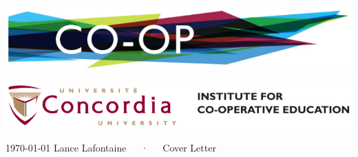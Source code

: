 \documentclass[11pt, a4paper]{awesome-cv}
\begin{document}
\includegraphics[scale=0.22]{coop-left}

\vspace{-10.5mm}

\hfill
\includegraphics[scale=0.18]{coop-right}

\vspace{-7mm}

\makecvheader[C]

\makecvfooter
  {\today}
  {Lance Lafontaine~~~·~~~Cover Letter}
  {}

\makelettertitle
\end{document}
